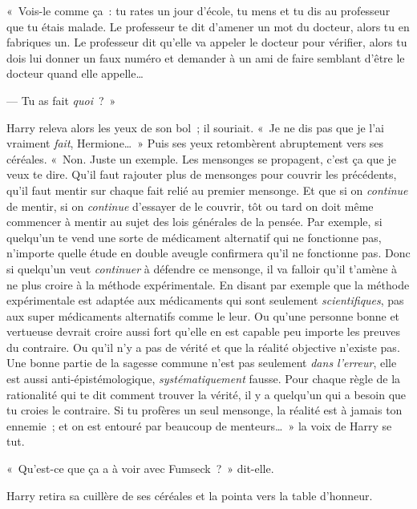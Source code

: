 «~Vois-le comme ça~: tu rates un jour d'école, tu mens et tu dis au professeur que tu étais malade.
Le professeur te dit d'amener un mot du docteur, alors tu en fabriques un.
Le professeur dit qu'elle va appeler le docteur pour vérifier, alors tu dois lui donner un faux numéro et demander à un ami de faire semblant d'être le docteur quand elle appelle…

--- Tu as fait \emph{quoi}~?~»

Harry releva alors les yeux de son bol~; il souriait.
«~Je ne dis pas que je l'ai vraiment \emph{fait}, Hermione…~»
Puis ses yeux retombèrent abruptement vers ses céréales.
«~Non. Juste un exemple.
Les mensonges se propagent, c'est ça que je veux te dire.
Qu'il faut rajouter plus de mensonges pour couvrir les précédents, qu'il faut mentir sur chaque fait relié au premier mensonge.
Et que si on \emph{continue} de mentir, si on \emph{continue} d'essayer de le couvrir, tôt ou tard on doit même commencer à mentir au sujet des lois générales de la pensée.
Par exemple, si quelqu'un te vend une sorte de médicament alternatif qui ne fonctionne pas, n'importe quelle étude en double aveugle confirmera qu'il ne fonctionne pas.
Donc si quelqu'un veut \emph{continuer} à défendre ce mensonge, il va falloir qu'il t'amène à ne plus croire à la méthode expérimentale.
En disant par exemple que la méthode expérimentale est adaptée aux médicaments qui sont seulement \emph{scientifiques}, pas aux super médicaments alternatifs comme le leur.
Ou qu'une personne bonne et vertueuse devrait croire aussi fort qu'elle en est capable peu importe les preuves du contraire.
Ou qu'il n'y a pas de vérité et que la réalité objective n'existe pas.
Une bonne partie de la sagesse commune n'est pas seulement \emph{dans l'erreur}, elle est aussi anti-épistémologique, \emph{systématiquement} fausse.
Pour chaque règle de la rationalité qui te dit comment trouver la vérité, il y a quelqu'un qui a besoin que tu croies le contraire.
Si tu profères un seul mensonge, la réalité est à jamais ton ennemie~; et on est entouré par beaucoup de menteurs…~»
la voix de Harry se tut.

«~Qu'est-ce que ça a à voir avec Fumseck~?~»
dit-elle.

Harry retira sa cuillère de ses céréales et la pointa vers la table d'honneur.

